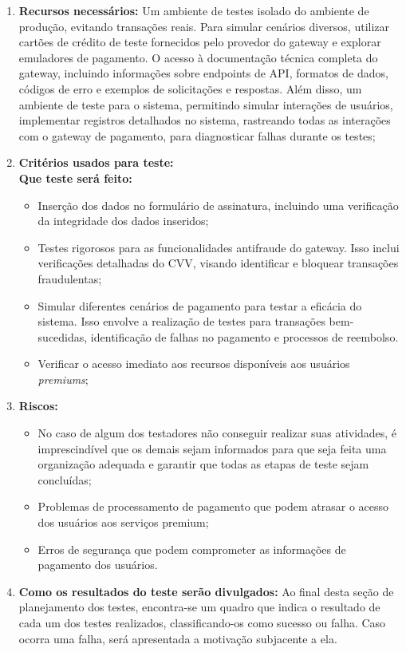 \begin{enumerate}
\item{\textbf{Recursos necessários:}}
Um ambiente de testes isolado do ambiente de produção, evitando transações reais. Para simular cenários diversos, utilizar cartões de crédito de teste fornecidos pelo provedor do gateway e explorar emuladores de pagamento. O acesso à documentação técnica completa do gateway, incluindo informações sobre endpoints de API, formatos de dados, códigos de erro e exemplos de solicitações e respostas. Além disso, um ambiente de teste para o sistema, permitindo simular interações de usuários, implementar registros detalhados no sistema, rastreando todas as interações com o gateway de pagamento, para diagnosticar falhas durante os testes;

\item{\textbf{Critérios usados para teste:}}
\\
\textbf{Que teste será feito:} 
\begin{itemize}
\item Inserção dos dados no formulário de assinatura, incluindo uma verificação da integridade dos dados inseridos;
\item Testes rigorosos para as funcionalidades antifraude do gateway. Isso inclui verificações detalhadas do CVV, visando identificar e bloquear transações fraudulentas;
\item Simular diferentes cenários de pagamento para testar a eficácia do sistema. Isso envolve a realização de testes para transações bem-sucedidas, identificação de falhas no pagamento e processos de reembolso.
\item Verificar o acesso imediato aos recursos disponíveis aos usuários \textit{premiums};
\end{itemize}

\item{\textbf{Riscos:}}
\begin{itemize}
\item No caso de algum dos testadores não conseguir realizar suas atividades, é imprescindível que os demais sejam informados para que seja feita uma organização adequada e garantir que todas as etapas de teste sejam concluídas;
\item Problemas de processamento de pagamento que podem atrasar o acesso dos usuários aos serviços premium;
\item Erros de segurança que podem comprometer as informações de pagamento dos usuários.
\end{itemize}

\item{\textbf{Como os resultados do teste serão divulgados:}}
Ao final desta seção de planejamento dos testes, encontra-se um quadro que indica o resultado de cada um dos testes realizados, classificando-os como sucesso ou falha. Caso ocorra uma falha, será apresentada a motivação subjacente a ela.
\end{enumerate}

